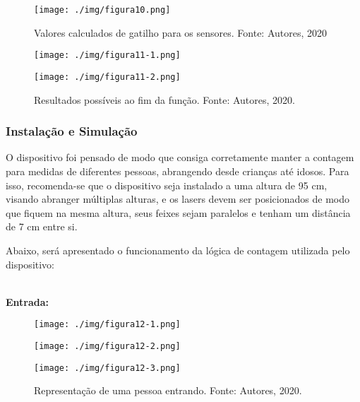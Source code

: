 \documentclass[10pt,twocolumn,letterpaper]{article}
\begin{document}
{
\begin{figure}[!h]
\begin{center}
   \texttt{[image: ./img/figura10.png]}
\end{center}
   \caption{Valores calculados de gatilho para os sensores. \newline \centering Fonte: Autores, 2020}
\label{fig:figura10}
\end{figure}
}

{
\begin{figure}[h]
    \begin{minipage}[!]{0.49\linewidth}
    \texttt{[image: ./img/figura11-1.png]}
    \end{minipage}
    \begin{minipage}[!]{0.49\linewidth}
    \texttt{[image: ./img/figura11-2.png]}
    \end{minipage}
    \caption{  Resultados possíveis ao fim da função. Fonte: Autores, 2020.}
\label{fig:figura11}
\end{figure}
}

\subsubsection{Instalação e Simulação}

O dispositivo foi pensado de modo que consiga corretamente manter a contagem para medidas de diferentes pessoas, abrangendo desde crianças até idosos. Para isso, recomenda-se que o dispositivo seja instalado a uma altura de 95 cm, visando abranger múltiplas alturas, e os lasers devem ser posicionados de modo que fiquem na mesma altura, seus feixes sejam paralelos e tenham um distância de 7 cm entre si.

Abaixo, será apresentado o funcionamento da lógica de contagem utilizada pelo dispositivo:

\noindent
\\
\textbf{Entrada:}

{
\begin{figure}[!h]
    \begin{minipage}[!]{0.31\linewidth}
    \texttt{[image: ./img/figura12-1.png]}
    \end{minipage}
    \begin{minipage}[!]{0.31\linewidth}
    \texttt{[image: ./img/figura12-2.png]}
    \end{minipage}
    \begin{minipage}[!]{0.31\linewidth}
    \texttt{[image: ./img/figura12-3.png]}
    \end{minipage}
    \caption{ Representação de uma pessoa entrando. \newline \centering Fonte: Autores, 2020.}
\label{fig:figura12}
\end{figure}
}
\end{document}
